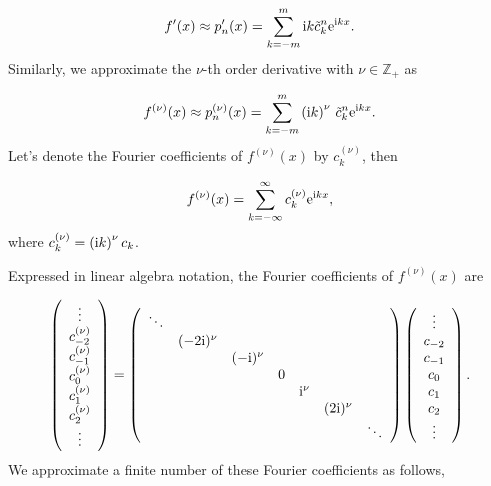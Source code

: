 \documentclass[12pt,a4paper]{article}
\begin{document}
\[
f'(x) \approx p_n'(x) = \sum_{k=-m}^{m} {\rm i }k\tilde{c}^n_k{\rm e}^{{\rm i}kx}.
\]
Similarly, we approximate the $\nu$-th order derivative with $\nu \in \mathbb{Z}_+$ as

\[
f^{(\nu)}(x) \approx p^{(\nu)}_n(x) = \sum_{k=-m}^{m} \left({\rm i }k\right)^{\nu}\,\tilde{c}^n_k{\rm e}^{{\rm i}kx}.
\]
Let's denote the Fourier coefficients of $f^{(\nu)}(x)$ by $c_k^{(\nu)}$, then

\[
f^{(\nu)}(x) = \sum_{k=-\infty}^{\infty}c_k^{(\nu)}{\rm e}^{{\rm i}kx},
\]
where $c_k^{(\nu)} =  \left( {\rm i}k \right)^{\nu} c_k$.  

Expressed in linear algebra notation, the Fourier coefficients of $f^{(\nu)}(x)$ are

\[
\left(\begin{array}{c}
\vdots \\
c_{-2}^{(\nu)}\\
c_{-1}^{(\nu)}\\
c_0^{(\nu)}\\
c_1^{(\nu)}\\
c_2^{(\nu)}\\
\vdots
\end{array}
\right)
= 
\left(
\begin{array}{c c c c c c c}
\ddots & & &  & & & \\
 & (-2{\rm i})^{\nu} & & & & & \\
  &  & (-{\rm i})^{\nu} & & & &  \\
  &  &  & 0 & & &  \\
    &  & & & {\rm i}^{\nu} & &  \\
 & & &     &  & (2{\rm i})^{\nu} &   \\
  & & &     &  & &  \ddots \\
\end{array}
\right)
\left(\begin{array}{c}
\vdots \\
c_{-2}\\
c_{-1}\\
c_0\\
c_1\\
c_2\\
\vdots
\end{array}
\right).
\]
We approximate a finite number of these Fourier coefficients as follows, 
\end{document}
